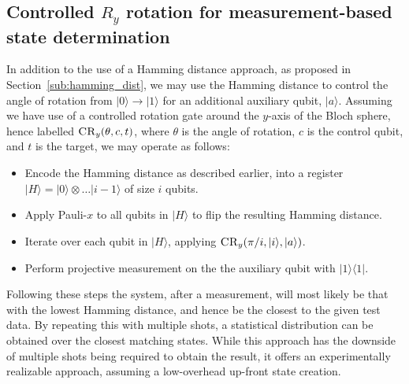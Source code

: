\begin{appendices}
\section{Controlled $R_y$ rotation for measurement-based state determination}\label{app:ry_phase}
In addition to the use of a Hamming distance approach, as proposed in Section~\ref{sub:hamming_dist}, we may use the Hamming distance to control the angle of rotation from $|0\rangle\rightarrow\vert 1\rangle$ for an additional auxiliary qubit, $\vert a \rangle$. Assuming we have use of a controlled rotation gate around the $y$-axis of the Bloch sphere, hence labelled $\textsc{CR}_y(\theta,c,t)$, where $\theta$ is the angle of rotation, $c$ is the control qubit, and $t$ is the target, we may operate as follows:
\begin{itemize}
    \item Encode the Hamming distance as described earlier, into a register $\vert H\rangle = \vert 0\rangle\otimes\dots\vert i-1\rangle$ of size $i$ qubits.
    \item Apply Pauli-$x$ to all qubits in $\vert H \rangle$ to flip the resulting Hamming distance.
    \item Iterate over each qubit in $\vert H\rangle$, applying $\textsc{CR}_y(\pi/i, \vert i \rangle, \vert a\rangle)$.
    \item Perform projective measurement on the the auxiliary qubit with $\vert 1\rangle\langle 1 \vert$.
\end{itemize}
Following these steps the system, after a measurement, will most likely be that with the lowest Hamming distance, and hence be the closest to the given test data. By repeating this with multiple shots, a statistical distribution can be obtained over the closest matching states.
While this approach has the downside of multiple shots being required to obtain the result, it offers an experimentally realizable approach, assuming a low-overhead up-front state creation.

\end{appendices}



